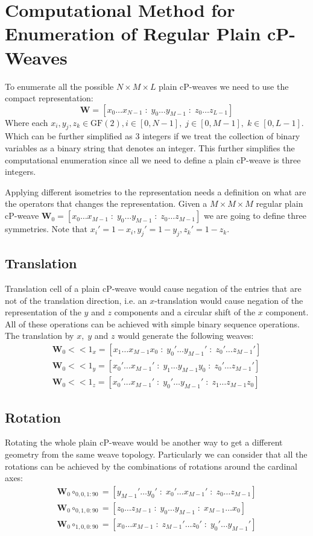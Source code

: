 \documentclass[unnumsec,webpdf,contemporary,large]{oup-authoring-template}%
\theoremstyle{thmstyleone}%
\theoremstyle{thmstyletwo}%
\theoremstyle{thmstylethree}%
\newcommand{\GF}{{\mathrm{GF}}}
\begin{document}
\section*{Computational Method for Enumeration of Regular Plain cP-Weaves}


To enumerate all the possible $N\times M\times L$ plain cP-weaves we need to use the compact representation:
\begin{equation}\label{eq:compactrep}
    \mathbf{W}=[x_0\dots x_{N-1}\;:\;y_0\dots y_{M-1}\;:\;z_0\dots z_{L-1}]
\end{equation}
Where each $x_i,y_j,z_k\in \GF(2), i\in [0,N-1],\;j\in[0,M-1],\;k\in[0,L-1]$. Which can be further simplified as 3 integers if we treat the collection of binary variables as a binary string that denotes an integer. This further simplifies the computational enumeration since all we need to define a plain cP-weave is three integers. 

Applying different isometries to the representation needs a definition on what are the operators that changes the representation. Given a $M\times M \times M$ regular plain cP-weave $\mathbf{W}_0=[x_0\dots x_{M-1}\;:\;y_0\dots y_{M-1}\;:\;z_0\dots z_{M-1}]$ we are going to define three symmetries. Note that $x_i'=1-x_i,y_j'=1-y_j, z_k'=1-z_k$.
\subsection*{Translation}
Translation cell of a plain cP-weave would cause negation of the entries that are not of the translation direction, i.e. an $x$-translation would cause negation of the representation of the $y$ and $z$ components and a circular shift of the $x$ component. All of these operations can be achieved with simple binary sequence operations. 
The translation by $x,\;y$ and $z$ would generate the following weaves:
\begin{align*}
    \mathbf{W}_0<<1_x=[x_1\dots x_{M-1}x_0\;:\;y_0'\dots y_{M-1}'\;:\;z_0'\dots z_{M-1}']\\
    \mathbf{W}_0<<1_y=[x_0'\dots x_{M-1}'\;:\;y_1\dots y_{M-1}y_0\;:\;z_0'\dots z_{M-1}']\\
    \mathbf{W}_0<<1_z=[x_0'\dots x_{M-1}'\;:\;y_0'\dots y_{M-1}'\;:\;z_1\dots z_{M-1}z_0]
\end{align*}
\subsection*{Rotation}
 Rotating the whole plain cP-weave would be another way to get a different geometry from the same weave topology. Particularly we can consider that all the rotations can be achieved by the combinations of rotations around the cardinal axes:
\begin{align*}
    \mathbf{W}_0\circ_{0,0,1:90}=[y_{M-1}'\dots y_0'\;:\;x_0'\dots x_{M-1}'\;:\;z_0\dots z_{M-1}]\\
    \mathbf{W}_0\circ_{0,1,0:90}=[z_{0}\dots z_{M-1}\;:\;y_{0}\dots y_{M-1}\;:\;x_{M-1}\dots x_{0}]\\
    \mathbf{W}_0\circ_{1,0,0:90}=[x_{0}\dots x_{M-1}\;:\;z_{M-1}'\dots z_{0}'\;:\;y_0'\dots y_{M-1}']\\
\end{align*}
\end{document}
